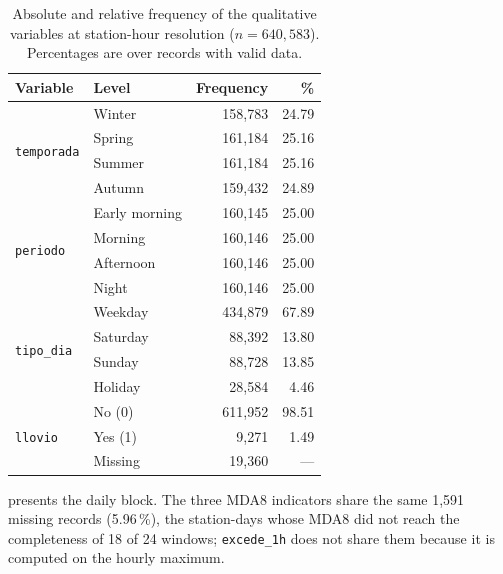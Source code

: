\begin{table}[pos=t]
  \centering
  \caption{Absolute and relative frequency of the qualitative variables at
    station-hour resolution ($n = 640{,}583$). Percentages are over records
    with valid data.}
  \label{tab:freq-horaria}
  \small
  \begin{tabular}{llrr}
    \toprule
    Variable & Level & Frequency & \% \\
    \midrule
    \multirow{4}{*}{\texttt{temporada}}
                                  & Winter    &   158,783 &  24.79 \\
                                  & Spring    &   161,184 &  25.16 \\
                                  & Summer    &   161,184 &  25.16 \\
                                  & Autumn    &   159,432 &  24.89 \\
    \midrule
    \multirow{4}{*}{\texttt{periodo}}
                                  & Early morning &   160,145 &  25.00 \\
                                  & Morning   &   160,146 &  25.00 \\
                                  & Afternoon &   160,146 &  25.00 \\
                                  & Night     &   160,146 &  25.00 \\
    \midrule
    \multirow{4}{*}{\texttt{tipo\_dia}}
                                  & Weekday   &   434,879 &  67.89 \\
                                  & Saturday  &    88,392 &  13.80 \\
                                  & Sunday    &    88,728 &  13.85 \\
                                  & Holiday   &    28,584 &   4.46 \\
    \midrule
    \multirow{3}{*}{\texttt{llovio}}
                                  & No (0)    &   611,952 &  98.51 \\
                                  & Yes (1)   &     9,271 &   1.49 \\
                                  & Missing   &    19,360 &    --- \\
    \bottomrule
  \end{tabular}
\end{table}

 presents the daily block. The three MDA8 indicators
share the same 1,591 missing records (5.96\,\%), the station-days whose MDA8
did not reach the completeness of 18 of 24 windows; \texttt{excede\_1h} does
not share them because it is computed on the hourly maximum.

